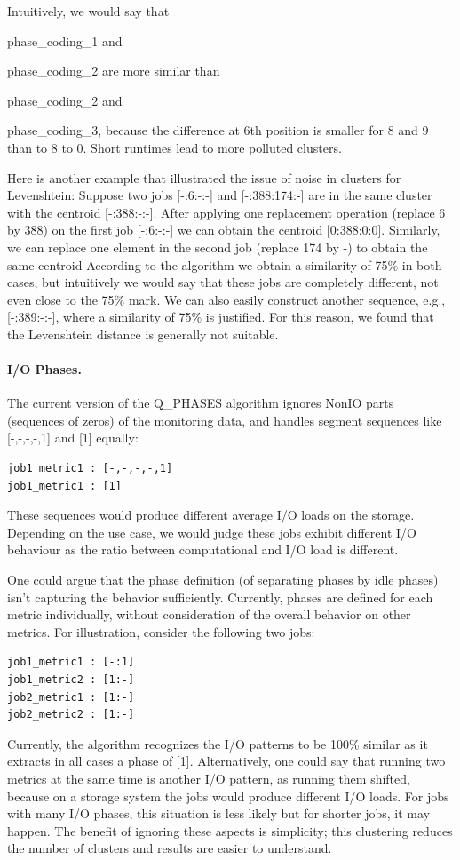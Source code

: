 \documentclass{jhps}
\begin{document}
Intuitively, we would say that {phase\_coding\_1 and{ phase\_coding\_2 are more similar than {phase\_coding\_2 and {phase\_coding\_3, because the difference at 6th position is smaller for 8 and 9 than to 8 to 0.
Short runtimes lead to more polluted clusters.

Here is another example that illustrated the issue of noise in clusters for Levenshtein:
Suppose two jobs [-:6:-:-] and [-:388:174:-] are in the same cluster with the centroid [-:388:-:-].
After applying one replacement operation (replace 6 by 388) on the first job [-:6:-:-] we can obtain the centroid [0:388:0:0].
Similarly, we can replace one element in the second job (replace 174 by -) to obtain the same centroid
According to the algorithm we obtain a similarity of 75\% in both cases, but intuitively we would say that these jobs are completely different, not even close to the 75$\%$  mark.
We can also easily construct another sequence, e.g., [-:389:-:-], where a similarity of 75$\%$  is justified.
For this reason, we found that the Levenshtein distance is generally not suitable.

\paragraph{I/O Phases.}
The current version of the Q\_PHASES algorithm ignores NonIO parts (sequences of zeros) of the monitoring data, and handles segment sequences like [-,-,-,-,1] and [1] equally:
\begin{lstlisting}
job1_metric1 : [-,-,-,-,1]
job1_metric1 : [1]
\end{lstlisting}

These sequences would produce different average I/O loads on the storage.
Depending on the use case, we would judge these jobs exhibit different I/O behaviour as the ratio between computational and I/O load is different.

One could argue that the phase definition (of separating phases by idle phases) isn't capturing the behavior sufficiently.
Currently, phases are defined for each metric individually, without consideration of the overall behavior on  other metrics.
For illustration, consider the following two jobs:
\begin{lstlisting}
job1_metric1 : [-:1]
job1_metric2 : [1:-]
job2_metric1 : [1:-]
job2_metric2 : [1:-]
\end{lstlisting}

Currently, the algorithm recognizes the I/O patterns to be 100$\%$ similar as it extracts in all cases a phase of [1].
Alternatively, one could say that running two metrics at the same time is another I/O pattern, as running them shifted, because on a storage system the jobs would produce different I/O loads.
For jobs with many I/O phases, this situation is less likely but for shorter jobs, it may happen.
The benefit of ignoring these aspects is simplicity; this clustering reduces the number of clusters and  results are easier to understand.

}}}}
\end{document}
